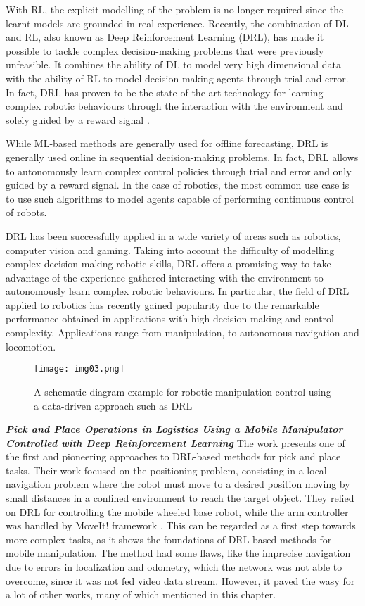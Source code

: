 With RL, the explicit modelling of the problem is no longer required since the learnt models are grounded
in real experience. Recently, the combination of DL and RL, also known as Deep Reinforcement Learning (DRL),
has made it possible to tackle complex decision-making problems that were previously unfeasible. It combines
the ability of DL to model very high dimensional data with the ability of RL to model decision-making agents
through trial and error.
In fact, DRL has proven to be the state-of-the-art technology for learning complex
robotic behaviours through the interaction with the environment and solely guided
by a reward signal \cite{liu2021deep}.

While ML-based methods are generally used for offline forecasting, DRL is generally used online in
sequential decision-making problems. In fact, DRL allows to autonomously learn complex control policies
through trial and error and only guided by a reward signal. In the case of robotics, the most common
use case is to use such algorithms to model agents capable of performing continuous control of robots.

DRL has been successfully applied in a wide variety of areas such as robotics, computer vision and gaming.
Taking into account the difficulty of modelling complex decision-making robotic skills, DRL offers
a promising way to take advantage of the experience gathered interacting with the environment to
autonomously learn complex robotic behaviours. In particular, the field of DRL applied to robotics has
recently gained popularity due to the remarkable performance obtained in applications 
with high decision-making and control complexity. 
Applications range from manipulation, to autonomous navigation and locomotion.
\cite{iriondo2023learning}

\begin{figure}[H]
	\centering
	\texttt{[image: img03.png]}
	\captionsetup{width=0.8\linewidth}
	\caption{A schematic diagram example for robotic manipulation control
		using a data-driven approach such as DRL \cite{liu2021deep}}
	\label{fig:img03}
\end{figure}

\textbf{\textit{Pick and Place Operations in Logistics Using
a Mobile Manipulator Controlled with Deep
Reinforcement Learning}} \quad
The work \cite{iriondo2019pickandplace} presents one of the first and pioneering approaches
to DRL-based methods for pick and place tasks. Their work focused on the positioning
problem, consisting in a local navigation problem where the robot must move to a desired
position moving by small distances in a confined environment to reach the target object.
They relied on DRL for controlling the mobile wheeled base robot, while the arm controller
was handled by MoveIt! framework \cite{moveit2}. This can be regarded as a first step towards
more complex tasks, as it shows the foundations of DRL-based methods for mobile manipulation.
The method had some flaws, like the imprecise navigation due to errors in localization and
odometry, which the network was not able to overcome, since it was not fed video data stream.
However, it paved the wasy for a lot of other works, many of which mentioned in this chapter.

